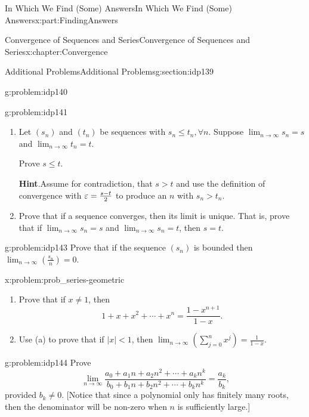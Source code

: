 \begin{partptx}{In Which We Find (Some) Answers}{}{In Which We Find (Some) Answers}{}{}{x:part:FindingAnswers}
\begin{chapterptx}{Convergence of Sequences and Series}{}{Convergence of Sequences and Series}{}{}{x:chapter:Convergence}
\begin{sectionptx}{Additional Problems}{}{Additional Problems}{}{}{g:section:idp139}
\begin{problem}{}{g:problem:idp140}
			\end{problem}
			\begin{problem}{}{g:problem:idp141}%
				\begin{enumerate}[font=\bfseries,label=(\alph*),ref=\alph*]
					\item{}Let \(\left(s_n\right)\) and \(\left(t_n\right)\) be sequences with \(s_n\leq t_n,\forall n\). Suppose \(\lim_{n\rightarrow\infty}s_n=s\) and \(\lim_{n\rightarrow\infty}t_n=t\).%
					\par
					Prove \(s\leq t\).%
					\par\smallskip%
					\noindent\textbf{\blocktitlefont Hint}.\hypertarget{g:hint:idp142}{}\quad{}Assume for contradiction, that \(s>t\) and use the definition of convergence with \(\varepsilon=\frac{s-t}{2}\) to produce an \(n\) with \(s_n>t_n\).%
					\item{}Prove that if a sequence converges, then its limit is unique.  That is, prove that if \(\lim_{n\rightarrow\infty}s_n=s\) and \(\lim_{n\rightarrow\infty}s_n=t\), then \(s=t\).%
				\end{enumerate}
			\end{problem}
			\begin{problem}{}{g:problem:idp143}%
				Prove that if the sequence \(\left(s_n\right)\) is bounded then \(\lim_{n\rightarrow\infty}\left(\frac{s_n}{n}\right)=0\).%
			\end{problem}
			\begin{problem}{}{x:problem:prob_series-geometric}%
				\begin{enumerate}[font=\bfseries,label=(\alph*),ref=\alph*]
					\item{}Prove that if \(x\neq 1\), then%
					\begin{equation*}
						1+x+x^2+\cdots+x^n=\frac{1-x^{n+1}}{1-x}\text{.}
					\end{equation*}
					\item{}Use (a) to prove that if \(|x|\lt 1\), then \(\lim_{n\rightarrow\infty}\left(\sum_{j=0}^nx^j\right)=\frac{1}{1-x}\).%
				\end{enumerate}
			\end{problem}
			\begin{problem}{}{g:problem:idp144}%
				 Prove%
				\begin{equation*}
					\lim_{n\rightarrow\infty}\frac{a_0+a_1n+a_2n^2+
						\cdots+a_kn^k}{b_0+b_1n+b_2n^2+\cdots+b_kn^k}=\frac{a_k}{b_k}\text{,}
				\end{equation*}
				provided \(b_k\neq 0\). [Notice that since a polynomial only has finitely many roots, then the denominator will be non-zero when \(n\) is sufficiently large.]%

\end{problem}
\end{sectionptx}
\end{chapterptx}
\end{partptx}
